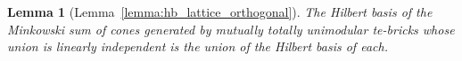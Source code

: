 \documentclass[11pt,a4paper]{amsart}
\theoremstyle{plain}
\newtheorem{lemma}[theorem]{Lemma}
\theoremstyle{definition}
\begin{document}
	\begin{lemma}[Lemma~\ref{lemma:hb_lattice_orthogonal}]\label{lemma:hb_minkowski_sum} The Hilbert basis of the Minkowski sum of cones generated by mutually totally unimodular te-bricks whose union is linearly independent is the union of the Hilbert basis of each.
	\end{lemma}
	
\end{document}
